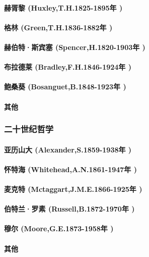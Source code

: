 \documentclass[UTF8]{../RepresentationUniverse}
\begin{document}
    \paragraph{赫胥黎 (Huxley,T.H.1825-1895年 )}
    \paragraph{格林 (Green,T.H.1836-1882年 )}
    \paragraph{赫伯特·斯宾塞 (Spencer,H.1820-1903年 )}
    \paragraph{布拉德莱 (Bradley,F.H.1846-1924年 )}
    \paragraph{鲍桑葵 (Bosanguet,B.1848-1923年 )}
    \paragraph{其他}

\subsubsection{二十世纪哲学}
    \paragraph{亚历山大 (Alexander,S.1859-1938年 )}
    \paragraph{怀特海 (Whitehead,A.N.1861-1947年 )}
    \paragraph{麦克特 (Mctaggart,J.M.E.1866-1925年 )}
    \paragraph{伯特兰·罗素 (Russell,B.1872-1970年 )}
    \paragraph{穆尔 (Moore,G.E.1873-1958年 )}
    \paragraph{其他}
\end{document}
